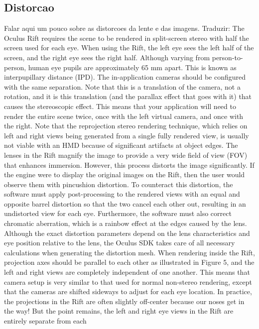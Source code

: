 \subsection{Distorcao}
Falar aqui um pouco sobre as distorcoes da lente e das imagens. Traduzir:
The Oculus Rift requires the scene to be rendered in split-screen stereo with half the screen used for each
eye. When using the Rift, the left eye sees the left half of the screen, and the right eye sees the right half.
Although varying from person-to-person, human eye pupils are approximately 65 mm apart. This is known
as interpupillary distance (IPD). The in-application cameras should be configured with the same separation.
Note that this is a translation of the camera, not a rotation, and it is this translation (and the parallax effect
that goes with it) that causes the stereoscopic effect. This means that your application will need to render the
entire scene twice, once with the left virtual camera, and once with the right.
Note that the reprojection stereo rendering technique, which relies on left and right views being generated
from a single fully rendered view, is usually not viable with an HMD because of significant artifacts at object
edges.
The lenses in the Rift magnify the image to provide a very wide field of view (FOV) that enhances immersion.
However, this process distorts the image significantly. If the engine were to display the original images on the
Rift, then the user would observe them with pincushion distortion.
To counteract this distortion, the software must apply post-processing to the rendered views with an equal
and opposite barrel distortion so that the two cancel each other out, resulting in an undistorted view for each
eye. Furthermore, the software must also correct chromatic aberration, which is a rainbow effect at the edges
caused by the lens. Although the exact distortion parameters depend on the lens characteristics and eye
position relative to the lens, the Oculus SDK takes care of all necessary calculations when generating the
distortion mesh.
When rendering inside the Rift, projection axes should be parallel
to each other as illustrated in Figure 5, and the left and right views
are completely independent of one another. This means that
camera setup is very similar to that used for normal non-stereo
rendering, except that the cameras are shifted sideways to adjust
for each eye location.
In practice, the projections in the Rift are often slightly off-center
because our noses get in the way! But the point remains, the left
and right eye views in the Rift are entirely separate from each
